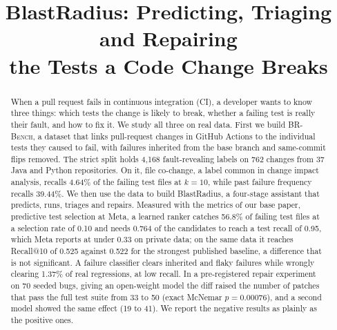 \documentclass[10pt,conference]{IEEEtran}
\newcommand{\brb}{\textsc{BR-Bench}}
\begin{document}
\title{BlastRadius: Predicting, Triaging and Repairing\\the Tests a Code Change Breaks}

\author{
}

\maketitle

\begin{abstract}
When a pull request fails in continuous integration (CI), a developer wants to know three things: which tests the change is likely to break, whether a failing test is really their fault, and how to fix it. We study all three on real data. First we build \brb{}, a dataset that links pull-request changes in GitHub Actions to the individual tests they caused to fail, with failures inherited from the base branch and same-commit flips removed. The strict split holds 4,168 fault-revealing labels on 762 changes from 37 Java and Python repositories. On it, file co-change, a label common in change impact analysis, recalls 4.64\% of the failing test files at $k=10$, while past failure frequency recalls 39.44\%. We then use the data to build BlastRadius, a four-stage assistant that predicts, runs, triages and repairs. Measured with the metrics of our base paper, predictive test selection at Meta, a learned ranker catches 56.8\% of failing test files at a selection rate of 0.10 and needs 0.764 of the candidates to reach a test recall of 0.95, which Meta reports at under 0.33 on private data; on the same data it reaches Recall@10 of 0.525 against 0.522 for the strongest published baseline, a difference that is not significant. A failure classifier clears inherited and flaky failures while wrongly clearing 1.37\% of real regressions, at low recall. In a pre-registered repair experiment on 70 seeded bugs, giving an open-weight model the diff raised the number of patches that pass the full test suite from 33 to 50 (exact McNemar $p=0.00076$), and a second model showed the same effect (19 to 41). We report the negative results as plainly as the positive ones.
\end{abstract}
\end{document}

